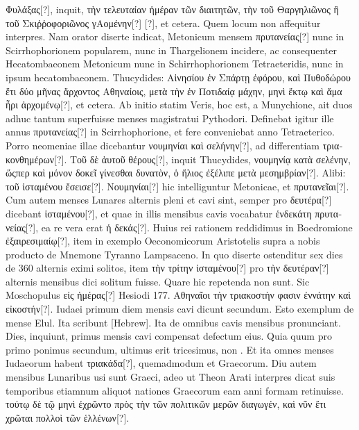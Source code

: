 \textgreek{Φυλάξας[?]}, inquit, \textgreek{τὴν τελευταίαν
ἡμέραν τῶν διαιτητῶν, τὴν τοῦ Θαργηλιῶνος ἢ τοῦ Σκιῤῥοφοριῶνος γΑομένην[?] [?]},
et cetera.
Quem locum non affequitur interpres.
Nam orator diserte
indicat, Metonicum mensem \textgreek{πρυτανείας[?]} nunc in Scirrhophorionem
popularem, nunc in Thargelionem incidere, ac consequenter
Hecatombaeonem Metonicum nunc in Schirrhophorionem Tetraeteridis,
nunc in ipsum hecatombaeonem.
Thucydides: \textgreek{Αἰνησίου ἐν Σπάρτῃ
ἐφόρου, καὶ Πυθοδώρου ἔτι δύο μῆνας ἄρχοντος Αθηναίοις, μετὰ τὴν ἐν
Ποτιδαίᾳ μάχην, μηνὶ ἕκτῳ καὶ ἅμα ἦρι ἀρχομένῳ[?]}, et cetera.
Ab initio statim
Veris, hoc est, a Munychione, ait duos adhuc tantum superfuisse
menses magistratui Pythodori.
Definebat igitur ille annus \textgreek{πρυτανείας[?]}
in Scirrhophorione, et fere conveniebat anno Tetraeterico.
Porro neomeniae
illae dicebantur \textgreek{νουμηνίαι καὶ σελήνην[?]}, ad differentiam
 \textgreek{τριακονθημέρων[?]}.
\textgreek{Τοῦ δὲ ἀυτοῦ θέρους[?]}, inquit Thucydides,
 \textgreek{νουμηνίᾳ κατὰ σελένην, ὥςπερ
καὶ μόνον δοκεῖ γίνεσθαι δυνατὸν, ὁ ἥλιος ἐξέλιπε μετὰ μεσημβρίαν[?]}.
Alibi:
\textgreek{τοῦ ἱσταμένου ἔσεισε[?]}.
\textgreek{Νουμηνίαι[?]} hic intelliguntur Metonicae, et
 \textgreek{πρυτανεῖαι[?]}.
Cum autem menses Lunares alternis pleni et cavi sint, semper pro
\textgreek{δευτέρα[?]} dicebant \textgreek{ἱσταμένου[?]},
 et quae in illis mensibus cavis
vocabatur \textgreek{ἑνδεκάτη πρυτανείας[?]},
 ea re vera erat \textgreek{ἡ δεκάς[?]}.
Huius rei rationem
reddidimus in Boedromione \textgreek{ἐξαιρεσιμαίῳ[?]}, item in exemplo
Oeconomicorum Aristotelis supra a nobis producto de Mnemone
Tyranno Lampsaceno.
In quo diserte ostenditur sex dies de 360 alternis
eximi solitos, item \textgreek{τὴν τρίτην ἱσταμένου[?]} pro
 \textgreek{τὴν δευτέραν[?]} alternis mensibus
dici solitum fuisse.
Quare hic repetenda non sunt.
Sic Moschopulus
\textgreek{εἰς ἡμέρας[?]} Hesiodi 177.
\textgreek{Αθηναῖοι τὴν τριακοστὴν φασιν ἐννάτην καὶ εἰκοστήν[?]}.
Iudaei primum diem mensis cavi dicunt secundum.
Esto exemplum
de mense Elul.
Ita scribunt \texthebrew{[Hebrew]}.
Ita de
omnibus cavis mensibus pronunciant.
Dies, inquiunt, primus mensis
cavi compensat defectum eius.
Quia quum pro primo ponimus secundum,
ultimus erit tricesimus, non .
Et ita omnes menses Iudaeorum
habent \textgreek{τριακάδα[?]}, quemadmodum et Graecorum.
Diu autem
mensibus Lunaribus usi sunt Graeci, adeo ut Theon Arati interpres
dicat suis temporibus etiamnum aliquot nationes Graecorum eam anni
formam retinuisse.
\textgreek{τούτῳ δὲ τῷ μηνὶ ἐχρῶντο πρὸς τὴν τῶν πολιτικῶν μερῶν
διαγωγέν, καὶ νῦν ἔτι χρῶται πολλοὶ τῶν ἑλλένων[?]}.
%
